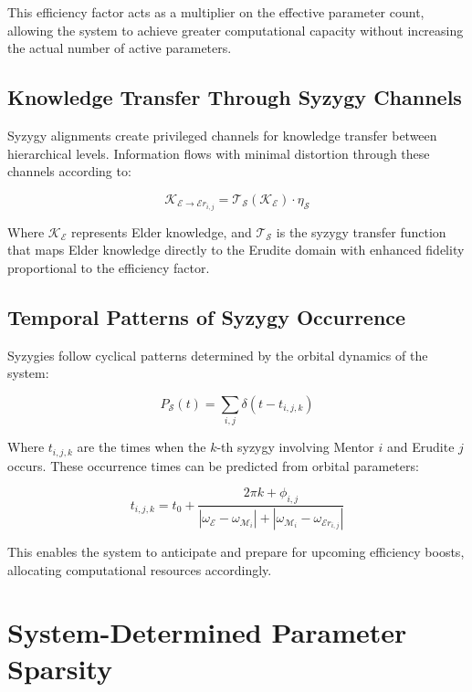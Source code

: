 This efficiency factor acts as a multiplier on the effective parameter count, allowing the system to achieve greater computational capacity without increasing the actual number of active parameters.

\subsection{Knowledge Transfer Through Syzygy Channels}

Syzygy alignments create privileged channels for knowledge transfer between hierarchical levels. Information flows with minimal distortion through these channels according to:

\begin{equation}
\mathcal{K}_{\mathcal{E} \rightarrow \mathcal{E}r_{i,j}} = \mathcal{T}_{\mathcal{S}}(\mathcal{K}_{\mathcal{E}}) \cdot \eta_\mathcal{S}
\end{equation}

Where $\mathcal{K}_{\mathcal{E}}$ represents Elder knowledge, and $\mathcal{T}_{\mathcal{S}}$ is the syzygy transfer function that maps Elder knowledge directly to the Erudite domain with enhanced fidelity proportional to the efficiency factor.

\subsection{Temporal Patterns of Syzygy Occurrence}

Syzygies follow cyclical patterns determined by the orbital dynamics of the system:

\begin{equation}
P_{\mathcal{S}}(t) = \sum_{i,j} \delta(t - t_{i,j,k})
\end{equation}

Where $t_{i,j,k}$ are the times when the $k$-th syzygy involving Mentor $i$ and Erudite $j$ occurs. These occurrence times can be predicted from orbital parameters:

\begin{equation}
t_{i,j,k} = t_0 + \frac{2\pi k + \phi_{i,j}}{|\omega_{\mathcal{E}} - \omega_{\mathcal{M}_i}| + |\omega_{\mathcal{M}_i} - \omega_{\mathcal{E}r_{i,j}}|}
\end{equation}

This enables the system to anticipate and prepare for upcoming efficiency boosts, allocating computational resources accordingly.

\section{System-Determined Parameter Sparsity}

